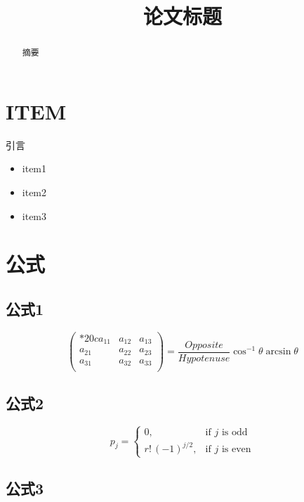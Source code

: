\documentclass[bwprint]{cumcmthesis}
\title{论文标题}
\begin{document}
 \maketitle
 \begin{abstract}
 摘要

\end{abstract}

\section{ITEM}

引言 \cite{huwei}

\begin{itemize}
	\item item1 \cite{deng:01a}
	\item item2
	\item item3
\end{itemize}

\section{公式}

\subsection{公式1}

\[
\begin{pmatrix}{*{20}c}
{a_{11} } & {a_{12} } & {a_{13} }  \\
{a_{21} } & {a_{22} } & {a_{23} }  \\
{a_{31} } & {a_{32} } & {a_{33} }  \\
\end{pmatrix}
= \frac{{Opposite}}{{Hypotenuse}}\cos ^{ - 1} \theta \arcsin \theta
\]

\subsection{公式2}

\[
p_{j}=\begin{cases} 0,&\text{if $j$ is odd}\\
r!\,(-1)^{j/2},&\text{if $j$ is even}
\end{cases}
\]

\subsection{公式3}
\end{document}
